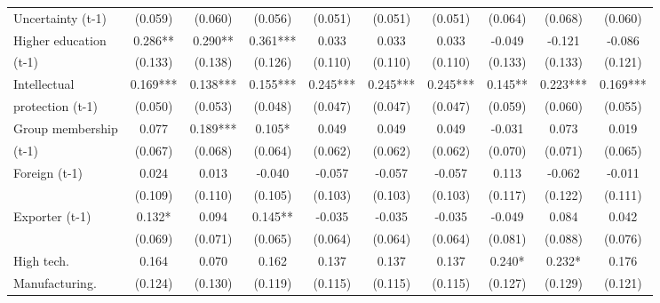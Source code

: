 \begin{table}[htbp]
\begin{tabular}{l*{9}{c}}
Uncertainty (t-1)   &     (0.059)   &     (0.060)   &     (0.056)   &     (0.051)   &     (0.051)   &     (0.051)   &     (0.064)   &     (0.068)   &     (0.060)   \\
Higher education    &       0.286** &       0.290** &       0.361***&       0.033   &       0.033   &       0.033   &      -0.049   &      -0.121   &      -0.086   \\
(t-1)               &     (0.133)   &     (0.138)   &     (0.126)   &     (0.110)   &     (0.110)   &     (0.110)   &     (0.133)   &     (0.133)   &     (0.121)   \\
Intellectual        &       0.169***&       0.138***&       0.155***&       0.245***&       0.245***&       0.245***&       0.145** &       0.223***&       0.169***\\
protection (t-1)    &     (0.050)   &     (0.053)   &     (0.048)   &     (0.047)   &     (0.047)   &     (0.047)   &     (0.059)   &     (0.060)   &     (0.055)   \\
Group membership    &       0.077   &       0.189***&       0.105*  &       0.049   &       0.049   &       0.049   &      -0.031   &       0.073   &       0.019   \\
(t-1)               &     (0.067)   &     (0.068)   &     (0.064)   &     (0.062)   &     (0.062)   &     (0.062)   &     (0.070)   &     (0.071)   &     (0.065)   \\
Foreign (t-1)       &       0.024   &       0.013   &      -0.040   &      -0.057   &      -0.057   &      -0.057   &       0.113   &      -0.062   &      -0.011   \\
                    &     (0.109)   &     (0.110)   &     (0.105)   &     (0.103)   &     (0.103)   &     (0.103)   &     (0.117)   &     (0.122)   &     (0.111)   \\
Exporter (t-1)      &       0.132*  &       0.094   &       0.145** &      -0.035   &      -0.035   &      -0.035   &      -0.049   &       0.084   &       0.042   \\
                    &     (0.069)   &     (0.071)   &     (0.065)   &     (0.064)   &     (0.064)   &     (0.064)   &     (0.081)   &     (0.088)   &     (0.076)   \\
High tech.          &       0.164   &       0.070   &       0.162   &       0.137   &       0.137   &       0.137   &       0.240*  &       0.232*  &       0.176   \\
Manufacturing.      &     (0.124)   &     (0.130)   &     (0.119)   &     (0.115)   &     (0.115)   &     (0.115)   &     (0.127)   &     (0.129)   &     (0.121)   \\

\end{tabular}
\end{table}
